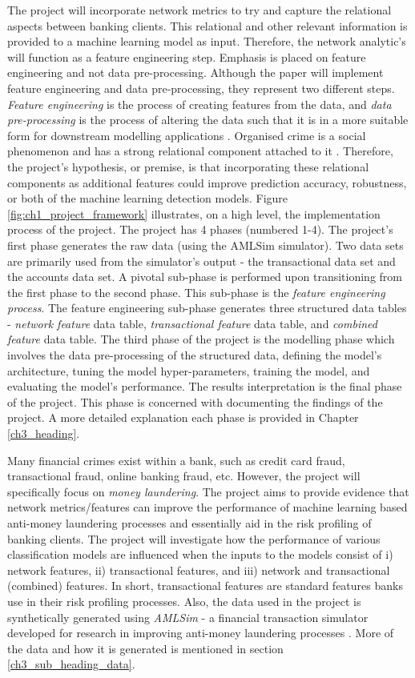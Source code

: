 The project will incorporate network metrics to try and capture the relational aspects between banking clients. This relational and other relevant information is provided to a machine learning model as input. Therefore, the network analytic's will function as a feature engineering step.  Emphasis is placed on feature engineering and not data pre-processing.  Although the paper will implement feature engineering and data pre-processing, they represent two different steps. \textit{Feature engineering} is the process of creating features from the data, and \textit{data pre-processing} is the process of altering the data such that it is in a more suitable form for downstream modelling applications \citep*{brownlee_2021, patidar_2021}. Organised crime is a social phenomenon and has a strong relational component attached to it \citep{baesens2015fraud}. Therefore, the project's hypothesis, or premise, is that incorporating these relational components as additional features could improve prediction accuracy, robustness, or both of the machine learning detection models. Figure \ref{fig:ch1_project_framework} illustrates, on a high level, the implementation process of the project. The project has 4 phases (numbered 1-4). The project's first phase generates the raw data (using the AMLSim simulator). Two data sets are primarily used from the simulator's output - the transactional data set and the accounts data set. A pivotal sub-phase is performed upon transitioning from the first phase to the second phase. This sub-phase is the \textit{feature engineering process}. The feature engineering sub-phase generates three structured data tables - \textit{network feature} data table, \textit{transactional feature} data table, and \textit{combined feature} data table. The third phase of the project is the modelling phase which involves the data pre-processing of the structured data, defining the model's architecture, tuning the model hyper-parameters, training the model, and evaluating the model's performance. The results interpretation is the final phase of the project. This phase is concerned with documenting the findings of the project. A more detailed explanation each phase is provided in Chapter \ref{ch3_heading}.   

Many financial crimes exist within a bank, such as credit card fraud, transactional fraud, online banking fraud, etc. However, the project will specifically focus on \textit{money laundering}. The project aims to provide evidence that network metrics/features can improve the performance of machine learning based anti-money laundering processes and essentially aid in the risk profiling of banking clients. The project will investigate how the performance of various classification models are influenced when the inputs to the models consist of i) network features, ii) transactional features,  and iii) network and transactional (combined) features. In short, transactional features are standard features banks use in their risk profiling processes. Also, the data used in the project is synthetically generated using \textit{AMLSim} - a financial transaction simulator developed for research in improving anti-money laundering processes \citep*{AMLSim} . More of the data and how it is generated is mentioned in section \ref{ch3_sub_heading_data}. 

